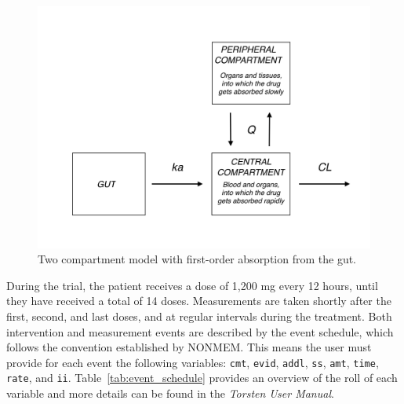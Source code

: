 \begin{figure}
  \begin{center}
  \includegraphics[width=5in]{../figures/TwoCptNice.png}
  \caption{Two compartment model with first-order absorption from the gut.}
  \label{fig:twocpt}
  \end{center}
\end{figure}

During the trial, the patient receives a dose of 1,200 mg every 12 hours, until they have received a total of 14 doses.
Measurements are taken shortly after the first, second, and last doses, and at regular intervals during the treatment.
Both intervention and measurement events are described by the event schedule, which follows the convention established by NONMEM.
This means the user must provide for each event the following variables: \texttt{cmt}, \texttt{evid}, \texttt{addl}, \texttt{ss}, \texttt{amt}, \texttt{time}, \texttt{rate}, and \texttt{ii}.
Table~\ref{tab:event_schedule} provides an overview of the roll of each variable and more details can be found in the \textit{Torsten User Manual}.

